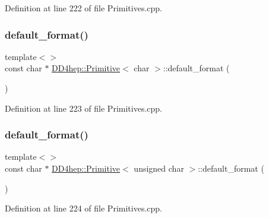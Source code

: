 Definition at line 222 of file Primitives.\+cpp.

\hypertarget{struct_d_d4hep_1_1_primitive_ae14f5e3c0bbfb2c5ac9cccd53b64d7e6}{}\label{struct_d_d4hep_1_1_primitive_ae14f5e3c0bbfb2c5ac9cccd53b64d7e6} 
\subsubsection{\texorpdfstring{default\+\_\+format()}{default\_format()}\hspace{0.1cm}{\footnotesize\ttfamily [3/15]}}
{\footnotesize\ttfamily template$<$$>$ \\
const char $\ast$ \hyperlink{struct_d_d4hep_1_1_primitive}{D\+D4hep\+::\+Primitive}$<$ char $>$\+::default\+\_\+format (\begin{DoxyParamCaption}{ }\end{DoxyParamCaption})}



Definition at line 223 of file Primitives.\+cpp.

\hypertarget{struct_d_d4hep_1_1_primitive_a9871b33130984b7d8816225c74230b23}{}\label{struct_d_d4hep_1_1_primitive_a9871b33130984b7d8816225c74230b23} 
\subsubsection{\texorpdfstring{default\+\_\+format()}{default\_format()}\hspace{0.1cm}{\footnotesize\ttfamily [4/15]}}
{\footnotesize\ttfamily template$<$$>$ \\
const char $\ast$ \hyperlink{struct_d_d4hep_1_1_primitive}{D\+D4hep\+::\+Primitive}$<$ unsigned char $>$\+::default\+\_\+format (\begin{DoxyParamCaption}{ }\end{DoxyParamCaption})}



Definition at line 224 of file Primitives.\+cpp.

\hypertarget{struct_d_d4hep_1_1_primitive_aa575940300c3ff97164efc17e8b998fc}{}\label{struct_d_d4hep_1_1_primitive_aa575940300c3ff97164efc17e8b998fc} 
